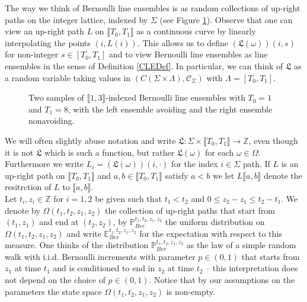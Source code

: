 The way we think of Bernoulli line ensembles is as random collections of up-right paths on the integer lattice, indexed by $\Sigma$ (see Figure \ref{S3_1}). Observe that one can view an up-right path $L$ on $\llbracket T_0, T_1 \rrbracket$ as a continuous curve by linearly interpolating the points $(i, L(i))$. This allows us to define $ (\mathfrak{L}(\omega)) (i, s)$ for non-integer $s \in [T_0,T_1]$ and to view Bernoulli line ensembles as line ensembles in the sense of Definition \ref{CLEDef}. In particular, we can think of $\mathfrak{L}$ as a random variable taking values in $\left(C (\Sigma \times \Lambda), \mathcal{C}_{\Sigma}\right)$ with $\Lambda = [T_0, T_1]$.
\begin{figure}[h]
\centering
{}
\caption{Two samples of $\llbracket 1,3\rrbracket$-indexed Bernoulli line ensembles with $T_0 = 1$ and $T_1 = 8$, with the left ensemble avoiding and the right ensemble nonavoiding.}
\label{S3_1}
\end{figure}
We will often slightly abuse notation and write $\mathfrak{L}: \Sigma \times \llbracket T_0, T_1 \rrbracket \rightarrow \mathbb{Z}$, even though it is not $\mathfrak{L}$ which is such a function, but rather $\mathfrak{L}(\omega)$ for each $\omega \in \Omega$. Furthermore we write $L_i = (\mathfrak{L}(\omega)) (i, \cdot)$ for the index $i \in \Sigma$ path. If $L$ is an up-right path on $\llbracket T_0, T_1 \rrbracket$ and $a, b \in \llbracket T_0, T_1 \rrbracket$ satisfy $a < b$ we let $L\llbracket a, b \rrbracket$ denote the resitrction of $L$ to $\llbracket a,b\rrbracket$. \\

Let $t_i, z_i \in \mathbb{Z}$ for $i = 1,2$ be given such that $t_1 < t_2$ and $0 \leq z_2 - z_1 \leq t_2 - t_1$. We denote by $\Omega(t_1,t_2,z_1,z_2)$ the collection of up-right paths that start from $(t_1,z_1)$ and end at $(t_2,z_2)$, by $\mathbb{P}_{Ber}^{t_1,t_2, z_1, z_2}$ the uniform distribution on $\Omega(t_1,t_2,z_1,z_2)$ and write $\mathbb{E}^{t_1,t_2,z_1,z_2}_{Ber}$ for the expectation with respect to this measure. One thinks of the distribution $\mathbb{P}_{Ber}^{t_1,t_2, z_1, z_2}$ as the law of a simple random walk with i.i.d. Bernoulli increments with parameter $p \in (0,1)$ that starts from $z_1$ at time $t_1$ and is conditioned to end in $z_2$ at time $t_2$ -- this interpretation does not depend on the choice of $p \in (0,1)$. Notice that by our assumptions on the parameters the state space $\Omega(t_1,t_2,z_1,z_2)$ is non-empty.  


